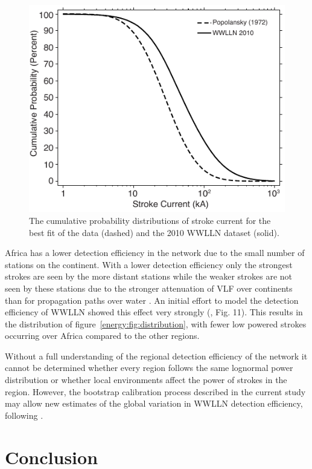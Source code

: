 \begin{figure}[ht!]
\centering
\includegraphics[scale=1]{energy/Figures/PPS_CDF.pdf}
\caption{The cumulative probability distributions of stroke current for the best fit of the \citet{Popolansky1972} data (dashed) and the 2010 WWLLN dataset (solid).}
\label{energy:fig:PPS_CDF}
\end{figure}

Africa has a lower detection efficiency in the network due to the small number of stations on the continent.
With a lower detection efficiency only the strongest strokes are seen by the more distant stations while the weaker strokes are not seen by these stations due to the stronger attenuation of VLF over continents than for propagation paths over water \citep{Wait1970}.
An initial effort to model the detection efficiency of WWLLN showed this effect very strongly (\citet{Rodger2006}, Fig. 11).
This results in the distribution of figure~\ref{energy:fig:distribution}, with fewer low powered strokes occurring over Africa compared to the other regions.

Without a full understanding of the regional detection efficiency of the network it cannot be determined whether every region follows the same lognormal power distribution or whether local environments affect the power of strokes in the region.
However, the bootstrap calibration process described in the current study may allow new estimates of the global variation in WWLLN detection efficiency, following \citet{Rodger2006}.

\section{Conclusion}

